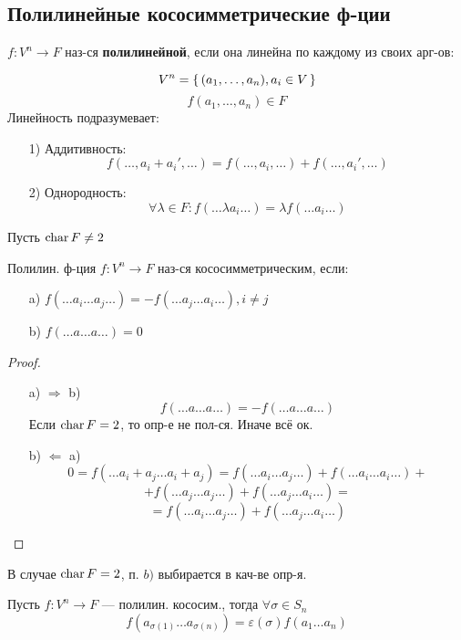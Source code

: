 \subsection{Полилинейные кососимметрические ф-ции} 
\begin{definition}
$f \colon V^{n} \rightarrow F$ наз-ся \textbf{полилинейной}, если она линейна по каждому из своих арг-ов:
\end{definition}
\[
V^{n} = \set{(a_1, \ldots, a_n), a_i \in V}
\]
\[
f(a_1, \ldots, a_n) \in F
\]
Линейность подразумевает:
\begin{itemize}
  \item [1) ] Аддитивность:
    \[
    f(\ldots, a_i + a_i', \ldots) = f(\ldots, a_i, \ldots) + f(\ldots, a_i', \ldots)
    \]
  \item [2) ] Однородность:
    \[
    \forall \lambda \in F \colon f(\ldots \lambda a_i \ldots) = \lambda f(\ldots a_i \ldots)
    \]
\end{itemize}
Пусть $\operatorname{char} F \neq 2$
\begin{definition}
Полилин. ф-ция $f \colon V^{n} \rightarrow F$ наз-ся кососимметрическим, если:
\begin{itemize}
  \item [a)] $f(\ldots a_i \ldots a_j \ldots) = -f(\ldots a_j \ldots a_i \ldots), i \neq j$
  \item [b)] $f(\ldots a \ldots a \ldots) = 0$
\end{itemize}
\end{definition}
\begin{proof}
  ~\newline
\begin{itemize}
  \item [a) $\Rightarrow$ b)] \[
  f(\ldots a \ldots a \ldots) = -f(\ldots a \ldots a \ldots) 
  \]
  Если $\operatorname{char} F = 2$, то опр-е не пол-ся. Иначе всё ок.
\item [b) $\Leftarrow$ a)]
  \[
  0 = f(\ldots a_i + a_j \ldots a_i + a_j) = f(\ldots a_i \ldots a_j \ldots) + f(\ldots a_i \ldots a_i \ldots) + 
  \]
  \[
   + f(\ldots a_j \ldots a_j \ldots) + f(\ldots a_j \ldots a_i \ldots) = 
  \]
  \[
    = f(\ldots a_i \ldots a_j \ldots) + f(\ldots a_j \ldots a_i \ldots)
  \]
\end{itemize}
\end{proof}
\begin{note}
В случае $\operatorname{char} F = 2$, п. $b) $ выбирается в кач-ве опр-я.
\end{note}
\begin{statement}
Пусть $f \colon V^{n} \rightarrow F$ --- полилин. кососим., тогда $\forall \sigma \in S_n$
\[
f(a_{\sigma(1)} \ldots a_{\sigma(n)}) = \varepsilon(\sigma) f(a_1\ldots a_n)
\]
\end{statement}
